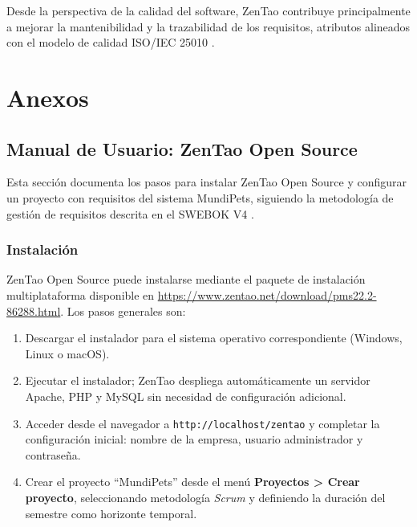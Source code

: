 \documentclass[journal,onecolumn]{IEEEtran}
\begin{document}
Desde la perspectiva de la calidad del software, ZenTao contribuye principalmente a mejorar la
mantenibilidad y la trazabilidad de los requisitos, atributos alineados con el modelo de calidad
ISO/IEC 25010 \cite{iso25010}.

\newpage
\printbibliography[heading=bibnumbered, title={Referencias}]

\newpage


\section{Anexos}



\subsection{Manual de Usuario: ZenTao Open Source}
\label{app:manual}

Esta sección documenta los pasos para instalar ZenTao Open Source y configurar un proyecto
con requisitos del sistema MundiPets, siguiendo la metodología de gestión de requisitos
descrita en el SWEBOK V4 \cite{swebok2024}.

\subsubsection{Instalación}

ZenTao Open Source puede instalarse mediante el paquete de instalación multiplataforma
disponible en \url{https://www.zentao.net/download/pms22.2-86288.html}. Los pasos generales son:

\begin{enumerate}
	\item Descargar el instalador para el sistema operativo correspondiente (Windows, Linux o macOS).
	\item Ejecutar el instalador; ZenTao despliega automáticamente un servidor
	Apache, PHP y MySQL sin necesidad de configuración adicional.
	\item Acceder desde el navegador a \texttt{http://localhost/zentao} y completar la configuración
	inicial: nombre de la empresa, usuario administrador y contraseña.
	\item Crear el proyecto ``MundiPets'' desde el menú \textbf{Proyectos > Crear proyecto},
	seleccionando metodología \textit{Scrum} y definiendo la duración del semestre como horizonte
	temporal.
\end{enumerate}
\end{document}
